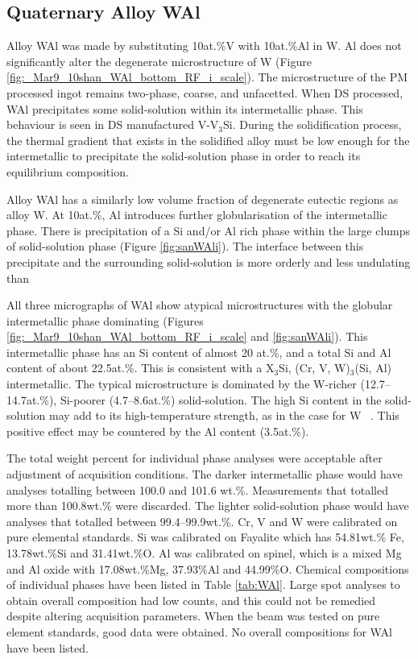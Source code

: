 \subsection{Quaternary Alloy WAl}

Alloy WAl was made by substituting 10at.\%V with 10at.\%Al in W.  Al does not significantly alter the degenerate microstructure of W (Figure \ref{fig:_Mar9_10shan_WAl_bottom_RF_i_scale}).  The microstructure of the PM processed ingot remains two-phase, coarse, and unfacetted.  When DS processed, WAl precipitates some solid-solution within its intermetallic phase.  This behaviour is seen in DS manufactured V-V$_3$Si.  During the solidification process, the thermal gradient that exists in the solidified alloy must be low enough for the intermetallic to precipitate the solid-solution phase in order to reach its equilibrium composition.

Alloy WAl has a similarly low volume fraction of degenerate eutectic regions as alloy W.  At 10at.\%, Al introduces further globularisation of the intermetallic phase.   There is precipitation of a Si and/or Al rich phase within the large clumps of solid-solution phase (Figure \ref{fig:sanWAli}).  The interface between this precipitate and the surrounding solid-solution is more orderly and less undulating than 

All three micrographs of WAl show atypical microstructures with the globular intermetallic phase dominating (Figures \ref{fig:_Mar9_10shan_WAl_bottom_RF_i_scale} and \ref{fig:sanWAli}).  This intermetallic phase has an Si content of almost 20 at.\%, and a total Si and Al content of about 22.5at.\%.  This is consistent with a X$_3$Si, (Cr, V, W)$_3$(Si, Al) intermetallic.  The typical microstructure is dominated by the W-richer (12.7--14.7at.\%), Si-poorer (4.7--8.6at.\%) solid-solution.  The high Si content in the solid-solution may add to its high-temperature strength, as in the case for W ~\cite{kumar10}.  This positive effect may be countered by the Al content (3.5at.\%).  

The total weight percent for individual phase analyses were acceptable after adjustment of acquisition conditions.  The darker intermetallic phase would have analyses totalling between 100.0 and 101.6 wt.\%.  Measurements that totalled more than 100.8wt.\% were discarded. The lighter solid-solution phase would have analyses that totalled between 99.4--99.9wt.\%.  Cr, V and W were calibrated on pure elemental standards.  Si was calibrated on Fayalite which has 54.81wt.\% Fe, 13.78wt.\%Si and 31.41wt.\%O.  Al was calibrated on spinel, which is a mixed Mg and Al oxide with 17.08wt.\%Mg, 37.93\%Al and 44.99\%O.   Chemical compositions of individual phases have been listed in Table \ref{tab:WAl}.  Large spot analyses to obtain overall composition had low counts, and this could not be remedied despite altering acquisition parameters.  When the beam was tested on pure element standards, good data were obtained.  No overall compositions for WAl have been listed.

